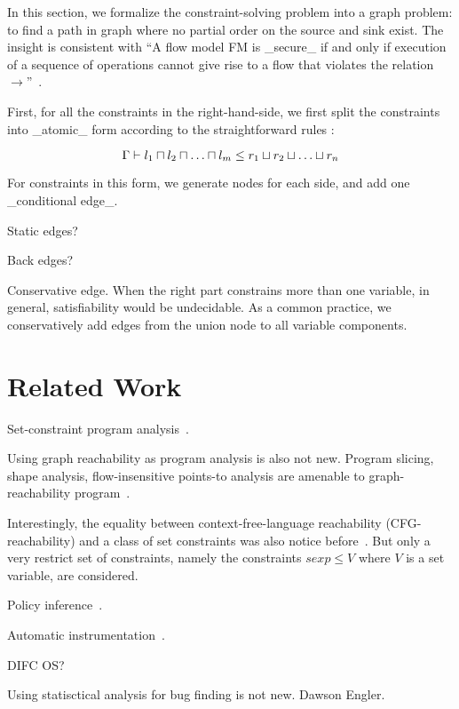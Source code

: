 In this section, we formalize the constraint-solving problem into a
graph problem: to find a path in graph where no partial order on the
source and sink exist. The insight is consistent with ``A flow model
FM is _secure_ if and only if execution of a sequence of operations
cannot give rise to a flow that violates the relation
$\rightarrow$''~\cite{denning-lattice}.

First, for all the constraints in the right-hand-side, we
first split the constraints into _atomic_ form according to the
straightforward rules :

\[
\G \proves l_1 \meet l_2 \meet \dots \meet l_m \leq r_1 \join r_2 \join \dots
\join r_n
\]

For constraints in this form, we generate nodes for each side, and
add one _conditional edge_.

Static edges?

Back edges?

 Conservative edge. When the right part constrains more
than one variable, in general, satisfiability would be undecidable. As
a common practice, we conservatively add edges from the
union node to all variable components.

\section{Related Work}

Set-constraint program analysis~\cite{aiken-setconstraint}.

Using graph reachability as program analysis is also not
new. Program slicing, shape analysis, flow-insensitive points-to
analysis are amenable to graph-reachability program~\cite{reps-graph}.

Interestingly, the equality between context-free-language reachability
(CFG-reachability) and a class of set constraints was also notice
before~\cite{melski-cflgraph}. But only a very restrict set of
constraints, namely the constraints $sexp \leq V$ where $V$ is a
set variable, are considered.

Policy inference~\cite{chong:sp11, harris:ccs10}.

Automatic instrumentation~\cite{king:esop10}.

DIFC OS?

Using statisctical analysis for bug finding is not new. Dawson Engler.





